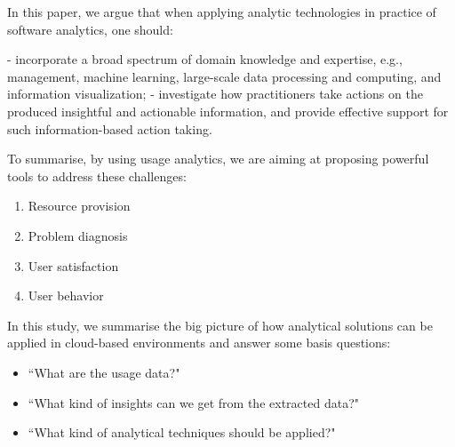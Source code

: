 In this paper, we argue that when applying analytic technologies in practice of software analytics, one should:

- incorporate a broad spectrum of domain knowledge and expertise, e.g., management, machine learning, large-scale data processing and computing, and information visualization;
- investigate how practitioners take actions on the produced insightful and actionable information, and provide effective support for such information-based action taking.

To summarise, by using usage analytics, we are aiming at proposing powerful tools to address these challenges: 
\begin{enumerate}
\item Resource provision
\item Problem diagnosis
\item User satisfaction
\item User behavior
\end{enumerate}

In this study, we summarise the big picture of how analytical solutions can be applied in cloud-based environments and answer some basis questions: 
\begin{itemize}
	\item ``What are the usage data?"
	\item ``What kind of insights can we get from the extracted data?"
	\item ``What kind of analytical techniques should be applied?"
\end{itemize}